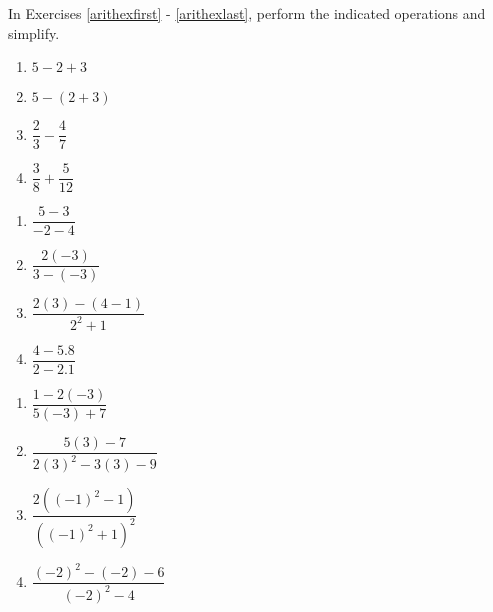 \documentclass{ximera}
\begin{document}
	\author{Stitz-Zeager}



\label{ExercisesforAppRealNumberArithmetic}

In Exercises \ref{arithexfirst} - \ref{arithexlast}, perform the indicated operations and simplify.

\begin{multicols}{4}
\begin{enumerate}

\item $5 - 2 + 3$ \label{arithexfirst}
\item $5 - (2+3)$
\item  $\dfrac{2}{3} - \dfrac{4}{7}$
\item  $\dfrac{3}{8} + \dfrac{5}{12}$

\setcounter{HW}{\value{enumi}}
\end{enumerate}
\end{multicols}

\begin{multicols}{4}
\begin{enumerate}
\setcounter{enumi}{\value{HW}}

\item  $\dfrac{5-3}{-2-4}$
\item  $\dfrac{2(-3)}{3 - (-3)}$
\item  $\dfrac{2(3)-(4-1)}{2^2 + 1}$
\item  $\dfrac{4 - 5.8}{2 - 2.1}$

\setcounter{HW}{\value{enumi}}
\end{enumerate}
\end{multicols}

\begin{multicols}{4}
\begin{enumerate}
\setcounter{enumi}{\value{HW}}

\item  $\dfrac{1 - 2(-3)}{5(-3) + 7}$
\item  $\dfrac{5(3) - 7}{2(3)^2-3(3)-9}$
\item  $\dfrac{2((-1)^2-1)}{((-1)^2+1)^2}$
\item  $\dfrac{(-2)^2 - (-2) - 6}{(-2)^2 - 4}$


\setcounter{HW}{\value{enumi}}
\end{enumerate}
\end{multicols}
\end{document}
